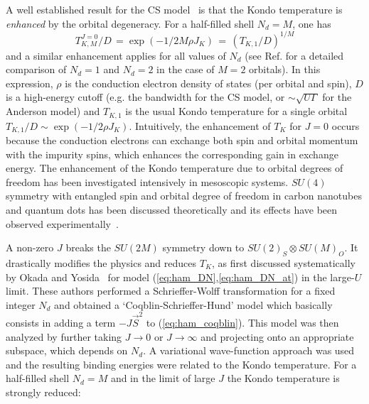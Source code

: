 \documentclass[]{ar2e-changed}%
\begin{document}
A well established result for the CS model~\cite{hewson_book_1993} is
that the Kondo temperature is {\it enhanced} by the orbital
degeneracy. For a half-filled shell $N_d=M$, one has
\begin{equation}
T_{K,M}^{J=0}/D\,=\exp(-1/2M\rho J_K)\,=\,\left(T_{K,1}/D\right)^{1/M}
\label{eq:TK_CS} %
\end{equation}
and a similar enhancement applies for all values of $N_d$ 
(see Ref.\cite{nishikawa_hewson_prb_2010_2} for a detailed 
comparison of $N_d=1$ and $N_d=2$ in the case of $M=2$ orbitals).  
%
In this expression, $\rho$ is the conduction electron density 
of states (per orbital and spin), $D$ is a high-energy cutoff (e.g. the bandwidth for the CS model, or $\sim\sqrt{U\Gamma}$ for 
the Anderson model) and $T_{K,1}$ is the usual Kondo temperature for a single orbital 
$T_{K,1}/D \sim \exp(-1/2\rho J_K)$. %
%
Intuitively, the enhancement of $T_K$ for $J=0$ occurs because the
conduction electrons can exchange both spin and orbital momentum with
the impurity spins, which enhances the corresponding gain in exchange energy. 
%
The enhancement of the Kondo temperature due to 
orbital degrees of freedom has been investigated intensively in
mesoscopic systems. $SU(4)$ symmetry with entangled spin and orbital degree
of freedom in carbon nanotubes and quantum dots has been discussed
theoretically \cite{borda_prl_2003,lehur_prb_2003,zarand_ssc_prb_2003,
  galpin_krishnamurthy_prl_2005, mravlje_prb_2006} and its effects
have been observed experimentally~\cite{jarillo-herrero_nature_2005}.

A non-zero $J$ breaks the $SU(2M)$ symmetry down to $SU(2)_S\otimes SU(M)_O$. 
It drastically modifies the physics and reduces $T_K$, as first discussed systematically
by Okada and Yosida~\cite{okada73} for model (\ref{eq:ham_DN},\ref{eq:ham_DN_at}) in the large-$U$ limit.
%
These authors performed a Schrieffer-Wolff transformation for a fixed
integer $N_d$ and obtained a `Coqblin-Schrieffer-Hund' model which 
basically consists in adding a term $-J\vec{S}^2$ to
(\ref{eq:ham_coqblin}). 
%
This model was then analyzed by further taking $J\to 0$ or $J\to \infty $ and projecting onto an appropriate subspace,
which depends on $N_d$.  A variational wave-function approach was used
and the resulting binding energies were related to the Kondo
temperature.  For a half-filled shell $N_d=M$ and in the limit of
large $J$ the Kondo temperature is strongly reduced: 
\end{document}
